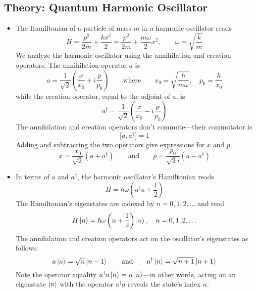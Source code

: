 \documentclass[11pt, a4paper]{article}
\newcommand{\eqtext}[1]{\qquad \text{#1} \qquad}
\begin{document}
\subsection{Theory: Quantum Harmonic Oscillator}
\begin{itemize}
	\item The Hamiltonian of a particle of mass $ m $ in a harmonic oscillator reads
	\begin{equation*}
		H = \frac{p^{2}}{2m} + \frac{kx^{2}}{2} = \frac{p^{2}}{2m} + \frac{m\omega}{2}x^{2}, \qquad \omega = \sqrt{\frac{k}{m}}
	\end{equation*}
	We analyze the harmonic oscillator using the annihilation and creation operators. The annihilation operator $ a $ is
	\begin{equation*}
		a = \frac{1}{\sqrt{2}}\left(\frac{x}{x_{0}} + i\frac{p}{p_{0}}\right) \eqtext{where} x_{0} = \sqrt{\frac{\hbar}{m\omega}}, \quad p_{0} = \frac{\hbar}{x_{0}}
	\end{equation*}
	while the creation operator, equal to the adjoint of $ a $, is
	\begin{equation*}
		a^{\dagger} = \frac{1}{\sqrt{2}}\left(\frac{x}{x_{0}} - i\frac{p}{p_{0}}\right)
	\end{equation*}
	The annihilation and creation operators don't commute---their commutator is 
	\begin{equation*}
		\big[a, a^{\dagger}\big] = 1
	\end{equation*}
	Adding and subtracting the two operators give expressions for $ x $ and $ p $
	\begin{equation*}
		x = \frac{x_{0}}{\sqrt{2}}(a + a^{\dagger}) \eqtext{and} p = \frac{p_{0}}{\sqrt{2}i}(a - a^{\dagger})
	\end{equation*}
	
	\item In terms of $ a $ and $ a^{\dagger} $, the harmonic oscillator's Hamiltonian reads
	\begin{equation*}
		H = \hbar \omega\left (a^{\dagger}a + \frac{1}{2}\right )
	\end{equation*}
	The Hamiltonian's eigenstates are indexed by $ n = 0, 1, 2, \ldots $ and read
	\begin{equation*}
		H \ket{n} = \hbar \omega \left(n + \frac{1}{2}\right)\ket{n}, \quad n = 0, 1, 2, \ldots
	\end{equation*}
	The annihilation and creation operators act on the oscillator's eigenstates as follows:
	\begin{equation*}
		a\ket{n} = \sqrt{n}\ket{n-1} \eqtext{and} a^{\dagger} \ket{n} = \sqrt{n + 1} \ket{n+1}
	\end{equation*}
	Note the operator equality $ a^{\dagger}a \ket{n} = n \ket{n}$---in other words, acting on an eigenstate $ \ket{n} $  with the operator $ a^{\dagger}a $ reveals the state's index $ n $. 
\end{itemize}
\end{document}
